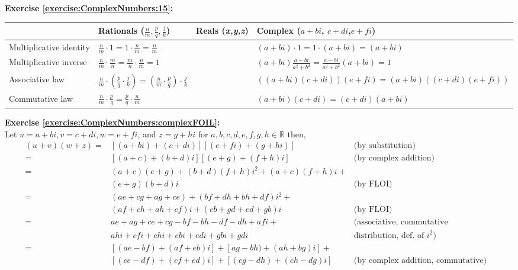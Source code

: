 \noindent\textbf{Exercise \ref{exercise:ComplexNumbers:15}:}%
\begin{table}[H]
\begin{tabular}{|p{2.8cm}|p{2.0cm}|p{2.6 cm}|p{2.8cm}|}
\hline 
\rule{0pt}{2.6ex} & Rationals ($\frac{n}{m},\frac{p}{q},\frac{j}{k}$)  & Reals (\emph{x,y,z})  & Complex ($a+bi$, $c+di$,$e+fi$)\rule[-1.2ex]{0pt}{0pt}\tabularnewline
\hline
\hline 
\rule{0pt}{2.6ex} Multiplicative identity  &$\frac{n}{m} \cdot 1 = 1 \cdot \frac{n}{m} = \frac{n}{m}$  & & $(a + bi) \cdot 1 = 1 \cdot (a + bi) = (a + bi)$ \rule[-1.2ex]{0pt}{0pt} \tabularnewline
\hline 
\rule{0pt}{2.6ex} Multiplicative inverse  &  $\frac{n}{m} \cdot \frac{m}{n} = \frac{m}{n} \cdot \frac{n}{m} = 1$ & &  $(a + bi) \frac{a - bi}{a^{2} + b^{2}}= \frac{a - bi}{a^{2} + b^{2}}(a + bi)=1$ \rule[-1.2ex]{0pt}{0pt} \tabularnewline
\hline 
\rule{0pt}{2.6ex} Associative law  & $\frac{n}{m}\cdot\left(\frac{p}{q}\cdot\frac{j}{k}\right) = \left(\frac{n}{m}\cdot\frac{p}{q}\right)\cdot\frac{j}{k}$ & & $((a+bi)(c+di))(e+fi) = (a+bi)((c+di)(e+fi))$ \rule[-1.2ex]{0pt}{0pt} \tabularnewline
\hline 
\rule{0pt}{2.6ex} Commutative law  & $\frac{n}{m}\cdot\frac{p}{q}= \frac{p}{q}\cdot\frac{n}{m}$ & & $(a+bi)(c+di)=(c+di)(a+bi)$ \rule[-1.2ex]{0pt}{0pt} \tabularnewline
\hline
\end{tabular}
\end{table}

\noindent\textbf{Exercise \ref{exercise:ComplexNumbers:complexFOIL}:}%
\\
Let $u = a + bi, v = c + di, w = e + fi$, and $z = g + hi$ for $a, b, c, d, e, f, g, h \in {\mathbb R}$ then,
\begin{align*}
(u + v)(w + z) = &[(a + bi) + (c + di)][(e + fi) + (g + hi)]&  \text{(by substitution)}&\\
= &[(a + c) + (b + d)i][(e + g) + (f + h)i]&  \text{(by complex addition)}&\\
= &(a + c)(e + g) + (b + d)(f + h)i^2 + (a + c)(f + h)i + \\
&(e + g)(b + d)i& \text{(by FLOI)}&\\
= &(ae + cg + ag + ce) + (bf + dh + bh + df)i^2 +\\
&(af + ch + ah + cf)i + (eb + gd + ed + gb)i& \text{(by FLOI)}&\\
= &ae + ag + ce + cg - bf - bh - df - dh + afi + & \text{(associative, commutative}\\
&ahi + cfi + chi + ebi + edi + gbi + gdi& \text{distribution, def. of } i^2)\\
= &[(ae - bf) + (af + eb)i] + [ag -bh) + (ah + bg)i] +\\
&[(ce - df) + (cf + ed)i] + [(cg - dh) + (ch - dg)i]& \text{(by complex addition, commutative)}\\
\end{align*}

